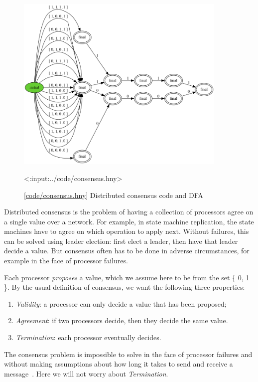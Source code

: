 \documentclass{report}
\newcommand{\harmonylink}[1]{%
[\href{https://harmony.cs.cornell.edu/#1}{\underline{#1}}]%
}
\newenvironment{code}{
\tcolorbox
}{
\endtcolorbox
}
\begin{document}
\begin{figure}
\begin{center}
\includegraphics[width=0.9\textwidth]{figures/consensus.png}
\end{center}
\begin{code}
<{:input:../code/consensus.hny}>
\end{code}
\caption{\harmonylink{code/consensus.hny} Distributed consensus code and DFA}
\label{fig:consensus}
\end{figure}

Distributed consensus is the problem of having a collection of processors agree
on a single value over a network.
For example, in state machine replication, the state machines have to agree
on which operation to apply next.
Without failures, this can be solved using leader election: first elect a leader, then have that leader decide a value.
But consensus often has to be done in adverse circumstances,
for example in the face of processor failures.

Each processor \emph{proposes} a value, which we assume here to be from the
set \{ 0, 1 \}.
By the usual definition of consensus, we want the following three properties:
\begin{enumerate}
\item \emph{Validity}: a processor can only decide a value that has been proposed;
\item \emph{Agreement}: if two processors decide, then they decide the same value.
\item \emph{Termination}: each processor eventually decides.
\end{enumerate}
The consensus problem is impossible to solve in the face of processor
failures and without making assumptions about how long it takes to send
and receive a message~\cite{FLP85}.
Here we will not worry about \emph{Termination}.
\end{document}
